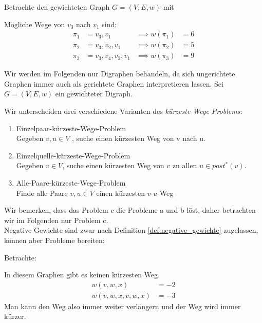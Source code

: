 \begin{example}
Betrachte den gewichteten Graph $G=(V,E,w)$ mit

\begin{center}
\begin{tikzpicture}



\end{tikzpicture}
\end{center}
Mögliche Wege von $v_3$ nach $v_1$ sind:
\begin{align*}
	\pi_1&=v_3,v_1 &\implies w(\pi_1)&=6 \\
	\pi_2&=v_3,v_2,v_1 &\implies w(\pi_2)&=5 \\
	\pi_3&=v_3,v_4,v_2,v_1 &\implies w(\pi_3)&=9
\end{align*}
\end{example}
\begin{notation}
Wir werden im Folgenden nur Digraphen behandeln, da sich ungerichtete Graphen immer auch als gerichtete Graphen interpretieren lassen.
Sei $G=(V,E,w) $ ein gewichteter Digraph.
\end{notation}
Wir unterscheiden drei verschiedene Varianten des \emph{kürzeste-Wege-Problems:}
\begin{enumerate}
	\item Einzelpaar-kürzeste-Wege-Problem \\
		Gegeben $v,u \in V$ , suche einen kürzesten Weg von v nach u.
	\item Einzelquelle-kürzeste-Wege-Problem \\
		Gegeben $v \in V$, suche einen kürzesten Weg von $v$ zu allen $u \in post^{*}(v)$.  
	\item Alle-Paare-kürzeste-Wege-Problem \\
		Finde alle Paare $v,u \in V$ einen kürzesten $v$-$u$-Weg
\end{enumerate}
Wir bemerken, dass das Problem c die Probleme a und b löst, daher betrachten wir im Folgenden nur Problem c. \\
Negative Gewichte sind zwar nach Definition \ref{def:negative_gewichte} zugelassen, können aber Probleme bereiten:
\begin{example}
Betrachte:
\begin{center}
\end{center}
In diesem Graphen gibt es keinen kürzesten Weg.
\begin{align*}
	w(v,w,x)&=-2 \\
	w(v,w,x,v,w,x)&=-3
\end{align*}
Man kann den Weg also immer weiter verlängern und der Weg wird immer kürzer.
\end{example}
